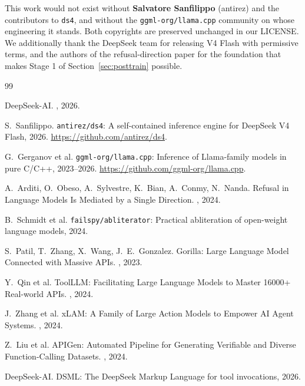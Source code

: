\documentclass[11pt,a4paper]{article}
\begin{document}
This work would not exist without \textbf{Salvatore Sanfilippo} (antirez) and the contributors to
\texttt{ds4}, and without the \texttt{ggml-org/llama.cpp} community on whose engineering it stands.
Both copyrights are preserved unchanged in our LICENSE. We additionally thank the DeepSeek team for
releasing V4 Flash with permissive terms, and the authors of the refusal-direction paper for the
foundation that makes Stage 1 of Section~\ref{sec:posttrain} possible.

\begin{thebibliography}{99}

DeepSeek-AI.
, 2026.

S.~Sanfilippo.
\newblock \texttt{antirez/ds4}: A self-contained inference engine for DeepSeek V4 Flash, 2026.
\newblock \url{https://github.com/antirez/ds4}.

G.~Gerganov et al.
\newblock \texttt{ggml-org/llama.cpp}: Inference of Llama-family models in pure C/C++, 2023--2026.
\newblock \url{https://github.com/ggml-org/llama.cpp}.

A.~Arditi, O.~Obeso, A.~Sylvestre, K.~Bian, A.~Conmy, N.~Nanda.
\newblock Refusal in Language Models Is Mediated by a Single Direction.
, 2024.

B.~Schmidt et al.
\newblock \texttt{failspy/abliterator}: Practical abliteration of open-weight language models, 2024.

S.~Patil, T.~Zhang, X.~Wang, J.~E.~Gonzalez.
\newblock Gorilla: Large Language Model Connected with Massive APIs.
, 2023.

Y.~Qin et al.
\newblock ToolLLM: Facilitating Large Language Models to Master 16000+ Real-world APIs.
, 2024.

J.~Zhang et al.
\newblock xLAM: A Family of Large Action Models to Empower AI Agent Systems.
, 2024.

Z.~Liu et al.
\newblock APIGen: Automated Pipeline for Generating Verifiable and Diverse Function-Calling Datasets.
, 2024.

DeepSeek-AI.
\newblock DSML: The DeepSeek Markup Language for tool invocations, 2026.


\end{thebibliography}
\end{document}
